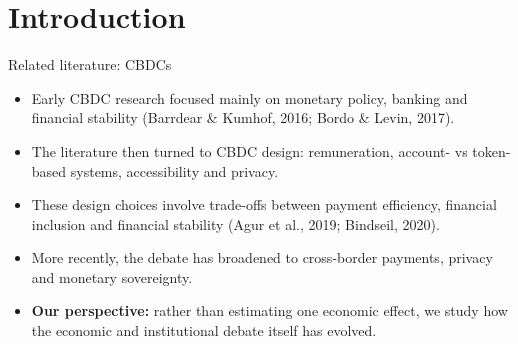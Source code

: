 \documentclass[aspectratio=169,10pt]{beamer}
\begin{document}
\section{Introduction}

\begin{frame}{Related literature: CBDCs}
\begin{itemize}
    \item Early CBDC research focused mainly on monetary policy, banking and financial stability (Barrdear \& Kumhof, 2016; Bordo \& Levin, 2017).

    \item The literature then turned to CBDC design: remuneration, account- vs token-based systems, accessibility and privacy.

    \item  These design choices involve trade-offs between payment efficiency, financial inclusion and financial stability (Agur et al., 2019; Bindseil, 2020).

    \item  More recently, the debate has broadened to cross-border payments, privacy and monetary sovereignty.

    \item \textbf{Our perspective:} rather than estimating one economic effect, we study how the economic and institutional debate itself has evolved.

\end{itemize}

\end{frame}
\end{document}
